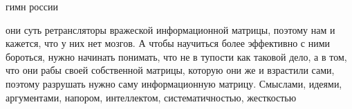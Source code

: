  
 
 
 
 

\Large




гимн россии

они суть ретрансляторы вражеской информационной матрицы, поэтому нам и кажется,
что у них нет мозгов. А чтобы научиться более эффективно с ними бороться, нужно
начинать понимать, что не в тупости как таковой дело, а в том, что они рабы
своей собственной матрицы, которую они же и взрастили сами, поэтому разрушать
нужно саму информационную матрицу. Смыслами, идеями, аргументами, напором,
интеллектом, систематичностью, жесткостью


